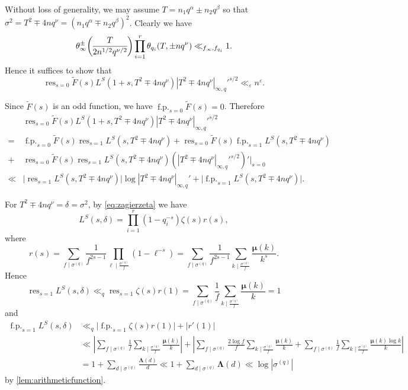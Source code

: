 \documentclass[10pt,oneside,reqno]{amsart}
\makeatletter
\DeclareMathOperator\res{res}
\DeclareMathOperator\fp{f.p.}
\newcommand\legendresymbol[2]{\genfrac{(}{)}{}{}{#1}{#2}}
\theoremstyle{THEOREM}
\theoremstyle{DEFINITION}
\theoremstyle{EXERCISE}
\numberwithin{equation}{section}
\renewenvironment{proof}[1][\proofname]{\par
  \vspace{-6pt}
  \pushQED{\qed}
  \normalfont \topsep6\p@\@plus6\p@\relax
  \trivlist
  \item[\hskip\labelsep\rmfamily\bfseries
    #1\@addpunct{:}]\ignorespaces
}{
  \popQED\endtrivlist\@endpefalse
  \vspace{-6pt}
}
\makeatother
\begin{document}
\begin{proof}
Without loss of generality, we may assume $T=n_1q^\alpha \pm n_2q^\beta$ so that $\sigma^2=T^2\mp 4nq^\nu=(n_1q^\alpha \mp n_2q^\beta)^2$. Clearly we have
\[
\theta_\infty^\pm\legendresymbol{T}{2n^{1/2}q^{\nu/2}}\\
    \prod_{i=1}^{r}\theta_{q_i}(T,\pm nq^\nu)\ll_{f_\infty,f_{q_i}} 1.
\]
Hence it suffices to show that
\[
\res_{s=0}\widetilde{F}(s)L^{S}(1+s,T^2\mp 4nq^\nu)|T^2\mp 4nq^\nu|_{\infty,q}'^{s/2}\ll_{\varepsilon} n^\varepsilon.
\]

Since $\widetilde{F}(s)$ is an odd function, we have $\fp_{s=0}\widetilde{F}(s)=0$. Therefore
\begin{align*}
   & \res_{s=0}\widetilde{F}(s)L^{S}(1+s,T^2\mp 4nq^\nu)|T^2\mp 4nq^\nu|_{\infty,q}'^{s/2}  \\
  = & \fp_{s=0}\widetilde{F}(s)\res_{s=1}L^{S}(s,T^2\mp 4nq^\nu)+\res_{s=0}\widetilde{F}(s)\fp_{s=1}L^{S}(s,T^2\mp 4nq^\nu)\\
  +& \res_{s=0}\widetilde{F}(s)\res_{s=1}L^{S}(s,T^2\mp 4nq^\nu)(|T^2\mp 4nq^\nu|_{\infty,q}'^{s/2})'|_{s=0} \\
  \ll &\mathopen{|}\res_{s=1}L^{S}(s,T^2\mp 4nq^\nu)\mathclose{|}\log|T^2\mp 4nq^\nu|_{\infty,q}'+\mathopen{|}\fp_{s=1}L^{S}(s,T^2\mp 4nq^\nu)\mathclose{|}.
\end{align*}

For $T^2\mp 4nq^\nu=\delta=\sigma^2$, by \eqref{eq:zagierzeta} we have 
\[
L^S(s,\delta)=\prod_{i=1}^{r}\left(1-q_i^{-s}\right)\zeta(s)r(s),
\]
where
\[
r(s)=\sum_{f\mid {\sigma^{(q)}}}\frac{1}{f^{2s-1}}\prod_{\ell\mid \frac{{\sigma^{(q)}}}{f}}\left(1-\ell^{-s}\right)=\sum_{f\mid {\sigma^{(q)}}}\frac{1}{f^{2s-1}}\sum_{k\mid \frac{{\sigma^{(q)}}}{f}}\frac{\bm{\mu}(k)}{k^s}.
\]
Hence
\[
\res_{s=1}L^S(s,\delta)\ll_q \res_{s=1}\zeta(s)r(1)=\sum_{f\mid {\sigma^{(q)}}}\frac{1}{f}\sum_{k\mid \frac{{\sigma^{(q)}}}{f}}\frac{\bm{\mu}(k)}{k}=1
\]
and 
\begin{align*}
   \fp_{s=1}L^S(s,\delta) & \ll_q \mathopen{|}\fp_{s=1}\zeta(s)r(1)\mathclose{|}+|r'(1)| \\
     & \ll\left|\sum_{f\mid {\sigma^{(q)}}}\frac{1}{f}\sum_{k\mid \frac{{\sigma^{(q)}}}{f}}\frac{\bm{\mu}(k)}{k}\right|+\left| \sum_{f\mid {\sigma^{(q)}}}\frac{2\log f}{f}\sum_{k\mid \frac{{\sigma^{(q)}}}{f}}\frac{\bm{\mu}(k)}{k}+\sum_{f\mid {\sigma^{(q)}}}\frac1f\sum_{k\mid \frac{{\sigma^{(q)}}}{f}}\frac{\bm{\mu}(k)\log k}{k}\right|\\
     &= 1+\sum_{d\mid \sigma^{(q)}}\frac{\bm{\Lambda}(d)}{d}\ll 1+\sum_{d\mid \sigma^{(q)}}\bm{\Lambda}(d)\ll \log|{\sigma^{(q)}}|
\end{align*}
by \autoref{lem:arithmeticfunction}.


\end{proof}
\end{document}
